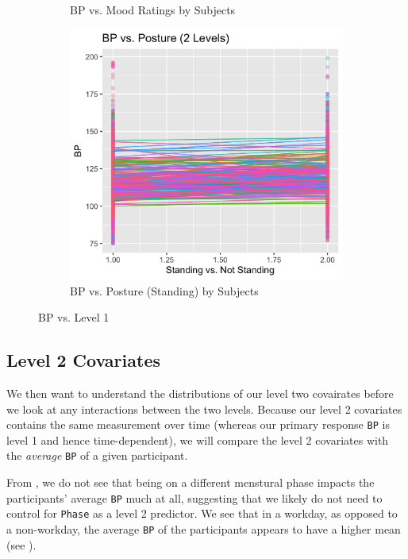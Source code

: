 \documentclass[12pt,twoside,leqno,fleqn,letterpaper]{article}
\theoremstyle{definition}
\theoremstyle{definition}
\begin{document}
\begin{figure}
\begin{subfigure}[b]{0.32\textwidth}
    \caption[]%
    {{\small BP vs. Mood Ratings by Subjects}}
    \label{fig: bp v mood}
    \end{subfigure}
    \hfill
    \begin{subfigure}[b]{0.32\textwidth}
    \centering
    \includegraphics[width=\textwidth]{pics/bp v stand.png}
    \caption[]%
    {{\small BP vs. Posture (Standing) by Subjects}}
    \label{fig: bp v stand}
    \end{subfigure}
    \caption[]
    {\small BP vs. Level 1}
    \label{fig: bp v level1}
    \end{figure}

\subsection{Level 2 Covariates}\label{sec: lv2}

We then want to understand the distributions of our level two covairates before we look at any interactions between the two levels. Because our level 2 covariates contains the same measurement over time (whereas our primary response \texttt{BP} is level 1 and hence time-dependent), we will compare the level 2 covariates with the \emph{average} \texttt{BP} of a given participant. 

From , we do not see that being on a different menstural phase impacts the participants' average \texttt{BP} much at all, suggesting that we likely do not need to control for \texttt{Phase} as a level 2 predictor. We see that in a workday, as opposed to a non-workday, the average \texttt{BP} of the participants appears to have a higher mean (see ). 
\end{document}

